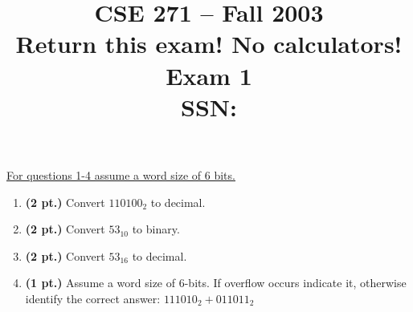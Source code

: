 \documentclass{article}
\begin{document}
\newcommand{\SOPmin}{${\rm SOP}_{\rm min} \ $}
\newcommand{\POSmin}{${\rm POS}_{\rm min} \ $}
\newcommand{\bs}{\backslash}


\title{
\Huge{CSE 271 -- Fall 2003}\\
\normalsize{Return this exam!  No calculators!}\\
\normalsize{Exam 1}\\
SSN:}
\date{}

\maketitle{}

\underline{For questions 1-4 assume a word size of 6 bits.}

\begin{enumerate}
\item {\bf (2 pt.)} Convert $110100_2$ to decimal.

\item {\bf (2 pt.)} Convert $53_{10}$ to binary.

\item {\bf (2 pt.)} Convert $53_{16}$ to decimal.

\pagebreak
\item {\bf (1 pt.)} Assume a word size of 6-bits.  If overflow occurs 
indicate it, otherwise identify the correct answer: $111010_2 + 011011_2$


\end{enumerate}
\end{document}
